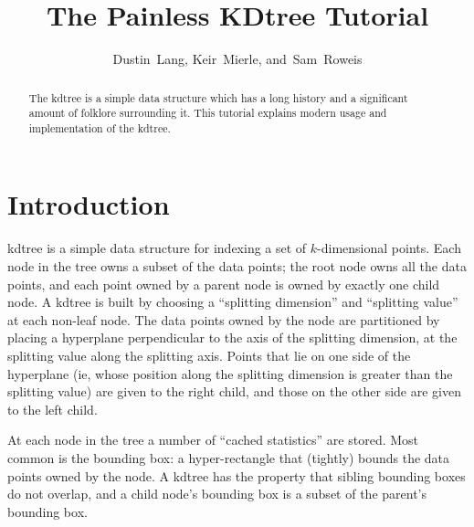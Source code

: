 \documentclass[journal]{IEEEtran}
\begin{document}
\title{The Painless KDtree Tutorial}
\author{Dustin~Lang,
        Keir~Mierle,
        and~Sam~Roweis}%
\maketitle

\begin{abstract}
  The kdtree is a simple data structure which has a long history and a
  significant amount of folklore surrounding it.
  This tutorial explains modern usage and implementation of the kdtree.
\end{abstract}

\section{Introduction}
 kdtree is a simple data structure for indexing a set of
$k$-dimensional points.
Each node in the tree owns a subset of the data points; the root node owns
all the data points, and each point owned by a parent node is owned by exactly
one child node.  A kdtree is built by choosing a 
``splitting dimension'' and ``splitting value'' at each non-leaf node.
The data points owned by the node are partitioned by placing a hyperplane
perpendicular to the axis of the splitting dimension, at the splitting value along
the splitting axis.  Points that lie on one side of the hyperplane (ie, whose position
along the splitting dimension is greater than the splitting value) are given to the
right child, and those on the other side are given to the left child.



At each node in the tree a number of ``cached statistics'' are stored.
Most common is the bounding box: a hyper-rectangle that (tightly) bounds
the data points owned by the node.
  A kdtree has the property that sibling bounding
boxes do not overlap, and a child node's bounding box is a subset of the parent's
bounding box.
\end{document}
